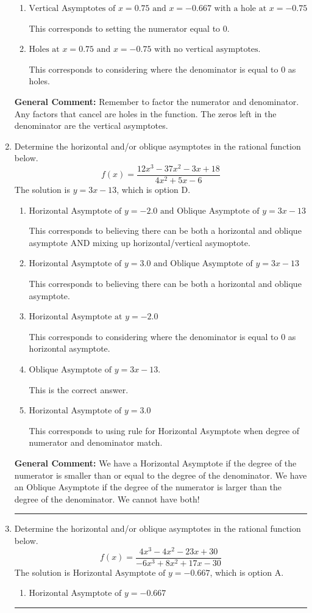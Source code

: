 \documentclass{extbook}[14pt]
\newcommand{\litem}[1]{\item #1

\rule{\textwidth}{0.4pt}}
\begin{document}
\begin{enumerate}
{\begin{enumerate}[label=\Alph*.]
This corresponds to not factoring out the hole.
\item \( \text{Vertical Asymptotes of } x = 0.75 \text{ and } x = -0.667 \text{ with a hole at } x = -0.75 \)

This corresponds to setting the numerator equal to 0.
\item \( \text{Holes at } x = 0.75 \text{ and } x = -0.75 \text{ with no vertical asymptotes.} \)

This corresponds to considering where the denominator is equal to 0 as holes.
\end{enumerate}

\textbf{General Comment:} Remember to factor the numerator and denominator. Any factors that cancel are holes in the function. The zeros left in the denominator are the vertical asymptotes.
}
\litem{
Determine the horizontal and/or oblique asymptotes in the rational function below.
\[ f(x) = \frac{12x^{3} -37 x^{2} -3 x + 18}{4x^{2} +5 x -6} \]The solution is \( y = 3x -13 \), which is option D.\begin{enumerate}[label=\Alph*.]
\item \( \text{Horizontal Asymptote of } y = -2.0 \text{ and Oblique Asymptote of } y = 3x -13 \)

This corresponds to believing there can be both a horizontal and oblique asymptote AND mixing up horizontal/vertical asymoptote.
\item \( \text{Horizontal Asymptote of } y = 3.0 \text{ and Oblique Asymptote of } y = 3x -13 \)

This corresponds to believing there can be both a horizontal and oblique asymptote.
\item \( \text{Horizontal Asymptote at } y = -2.0 \)

This corresponds to considering where the denominator is equal to 0 as horizontal asymptote.
\item \( \text{Oblique Asymptote of } y = 3x -13. \)

This is the correct answer.
\item \( \text{Horizontal Asymptote of } y = 3.0  \)

This corresponds to using rule for Horizontal Asymptote when degree of numerator and denominator match.
\end{enumerate}

\textbf{General Comment:} We have a Horizontal Asymptote if the degree of the numerator is smaller than or equal to the degree of the denominator. We have an Oblique Asymptote if the degree of the numerator is larger than the degree of the denominator. We cannot have both!
}
\litem{
Determine the horizontal and/or oblique asymptotes in the rational function below.
\[ f(x) = \frac{4x^{3} -4 x^{2} -23 x + 30}{-6x^{3} +8 x^{2} +17 x -30} \]The solution is \( \text{Horizontal Asymptote of } y = -0.667  \), which is option A.\begin{enumerate}[label=\Alph*.]
\item \( \text{Horizontal Asymptote of } y = -0.667  \)


\end{enumerate}}
\end{enumerate}
\end{document}
